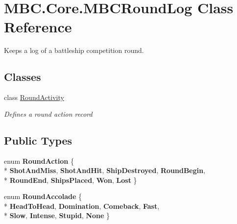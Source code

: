 \hypertarget{class_m_b_c_1_1_core_1_1_m_b_c_round_log}{\section{M\-B\-C.\-Core.\-M\-B\-C\-Round\-Log Class Reference}
\label{class_m_b_c_1_1_core_1_1_m_b_c_round_log}
}


Keeps a log of a battleship competition round. 


\subsection*{Classes}
\begin{DoxyCompactItemize}
\item 
class \hyperlink{class_m_b_c_1_1_core_1_1_m_b_c_round_log_1_1_round_activity}{Round\-Activity}
\begin{DoxyCompactList}\small\item\em Defines a round action record\end{DoxyCompactList}\end{DoxyCompactItemize}
\subsection*{Public Types}
\begin{DoxyCompactItemize}
\item 
enum {\bfseries Round\-Action} \{ \\*
{\bfseries Shot\-And\-Miss}, 
{\bfseries Shot\-And\-Hit}, 
{\bfseries Ship\-Destroyed}, 
{\bfseries Round\-Begin}, 
\\*
{\bfseries Round\-End}, 
{\bfseries Ships\-Placed}, 
{\bfseries Won}, 
{\bfseries Lost}
 \}
\item 
enum {\bfseries Round\-Accolade} \{ \\*
{\bfseries Head\-To\-Head}, 
{\bfseries Domination}, 
{\bfseries Comeback}, 
{\bfseries Fast}, 
\\*
{\bfseries Slow}, 
{\bfseries Intense}, 
{\bfseries Stupid}, 
{\bfseries None}
 \}
\end{DoxyCompactItemize}
